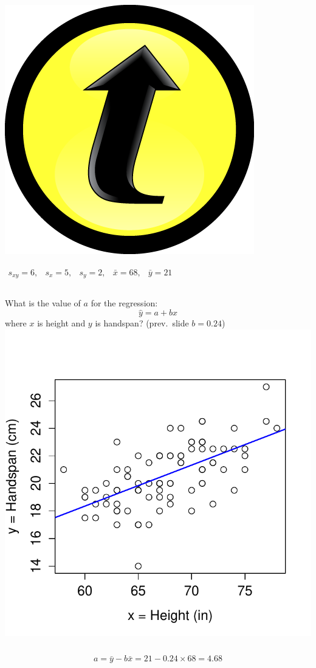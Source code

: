 \documentclass[handout]{beamer}
\begin{document}
\begin{frame}
\frametitle{\includegraphics[scale = 0.05]{./images/clicker}}
$\begin{array}{ccccc} s_{xy} = 6,&s_x = 5,& s_y = 2,& \bar{x} = 68,& \bar{y} = 21\end{array}$
\begin{columns}[c]
\column{2.5in}
What is the value of $a$ for the regression: $$\hat{y}=a+bx$$
where $x$ is height and $y$ is handspan? (prev.\ slide $b = 0.24$)
\column{1.8in}
\includegraphics[scale = 0.4]{./images/height_handspan2}
\end{columns}
\alert{$$a = \bar{y} - b \bar{x} = 21 - 0.24 \times 68 = 4.68 $$}
\end{frame}
\end{document}

